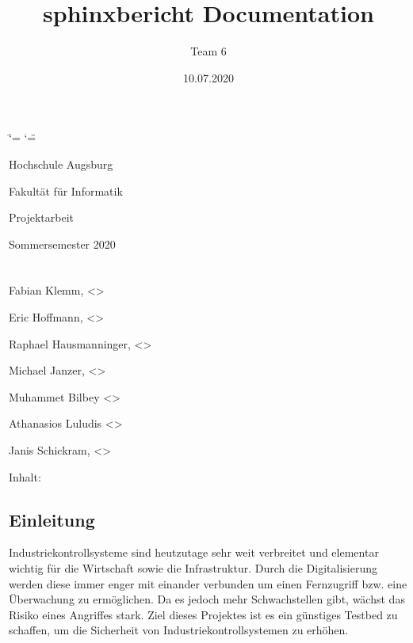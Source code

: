 \documentclass[letterpaper,10pt,ngerman]{sphinxmanual}
\title{sphinxbericht Documentation}
\date{10.07.2020}
\author{Team 6}
\begin{document}
\ifdefined\shorthandoff
  \ifnum\catcode`\=\string=\active\shorthandoff{=}\fi
  \ifnum\catcode`\"=\active{}\fi
\fi

\pagestyle{empty}
\sphinxmaketitle
\pagestyle{plain}
\sphinxtableofcontents
\pagestyle{normal}
\label{\detokenize{index::doc}}


\begin{DUlineblock}{0em}
\item[] Hochschule Augsburg
\item[] Fakultät für Informatik
\item[] Projektarbeit
\item[] Sommersemester 2020
\end{DUlineblock}


\chapter{}
\label{\detokenize{index:team}}
\begin{DUlineblock}{0em}
\item[] Fabian Klemm, \textless{}\textgreater{}
\item[] Eric Hoffmann, \textless{}\textgreater{}
\item[] Raphael Hausmanninger, \textless{}\textgreater{}
\item[] Michael Janzer, \textless{}\textgreater{}
\item[] Muhammet Bilbey \textless{}\textgreater{}
\item[] Athanasios Luludis \textless{}\textgreater{}
\item[] Janis Schickram, \textless{}\textgreater{}
\end{DUlineblock}

Inhalt:


\section{Einleitung}
\label{\detokenize{einleitung:einleitung}}\label{\detokenize{einleitung::doc}}
Industriekontrollsysteme sind heutzutage sehr weit verbreitet und elementar wichtig für die Wirtschaft sowie die Infrastruktur. Durch die Digitalisierung werden diese immer enger mit einander verbunden um einen Fernzugriff bzw. eine Überwachung zu ermöglichen. Da es jedoch mehr Schwachstellen gibt, wächst das Risiko eines Angriffes stark. Ziel dieses Projektes ist es ein günstiges Testbed zu schaffen, um die Sicherheit von Industriekontrollsystemen zu erhöhen.
\end{document}
